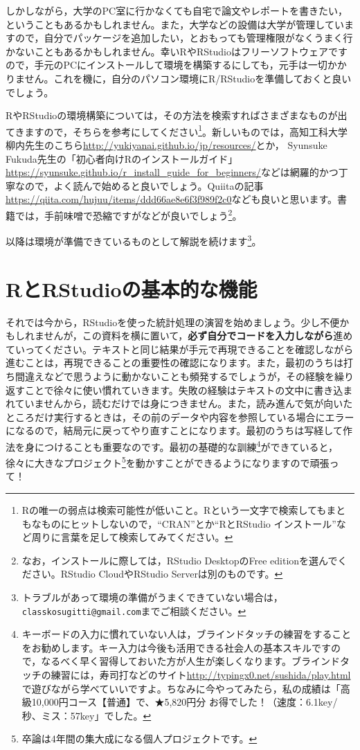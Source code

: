 \documentclass{ltjbook}
\begin{document}
しかしながら，大学のPC室に行かなくても自宅で論文やレポートを書きたい，ということもあるかもしれません。また，大学などの設備は大学が管理していますので，自分でパッケージを追加したい，とおもっても管理権限がなくうまく行かないこともあるかもしれません。幸いRやRStudioはフリーソフトウェアですので，手元のPCにインストールして環境を構築するにしても，元手は一切かかりません。これを機に，自分のパソコン環境にR/RStudioを準備しておくと良いでしょう。

RやRStudioの環境構築については，その方法を検索すればさまざまなものが出てきますので，そちらを参考にしてください\footnote{Rの唯一の弱点は検索可能性が低いこと。Rという一文字で検索してもまともなものにヒットしないので，``CRAN''とか``RとRStudio インストール''など周りに言葉を足して検索してみてください。}。新しいものでは，高知工科大学柳内先生のこちら\url{http://yukiyanai.github.io/jp/resources/}とか，
Syunsuke Fukuda先生の「初心者向けRのインストールガイド」\url{https://syunsuke.github.io/r_install_guide_for_beginners/}などは網羅的かつ丁寧なので，よく読んで始めると良いでしょう。Quiitaの記事\url{https://qiita.com/hujuu/items/ddd66ae8e6f3f989f2c0}なども良いと思います。書籍では，手前味噌で恐縮ですが\citet{kosugi2019}などが良いでしょう\footnote{なお，インストールに際しては，RStudio DesktopのFree editionを選んでください。RStudio CloudやRStudio Serverは別のものです。}。

以降は環境が準備できているものとして解説を続けます\footnote{トラブルがあって環境の準備がうまくできていない場合は，\texttt{classkosugitti@gmail.com}までご相談ください。}。

\section{RとRStudioの基本的な機能}
それでは今から，RStudioを使った統計処理の演習を始めましょう。少し不便かもしれませんが，この資料を横に置いて，\textbf{必ず自分でコードを入力しながら}進めていってください。テキストと同じ結果が手元で再現できることを確認しながら進むことは，再現できることの重要性の確認になります。また，最初のうちは打ち間違えなどで思うように動かないことも頻発するでしょうが，その経験を繰り返すことで徐々に使い慣れていきます。失敗の経験はテキストの文中に書き込まれていませんから，読むだけでは身につきません。また，読み進んで気が向いたところだけ実行するときは，その前のデータや内容を参照している場合にエラーになるので，結局元に戻ってやり直すことになります。最初のうちは写経して作法を身につけることも重要なのです。最初の基礎的な訓練\footnote{キーボードの入力に慣れていない人は，ブラインドタッチの練習をすることをお勧めします。キー入力は今後も活用できる社会人の基本スキルですので，なるべく早く習得しておいた方が人生が楽しくなります。ブラインドタッチの練習には，寿司打などのサイト\url{http://typingx0.net/sushida/play.html}で遊びながら学べていいですよ。ちなみに今やってみたら，私の成績は「高級10,000円コース【普通】で、★5,820円分 お得でした！（速度：6.1key/秒、ミス：57key」でした。}ができていると，徐々に大きなプロジェクト\footnote{卒論は4年間の集大成になる個人プロジェクトです。}を動かすことができるようになりますので頑張って！
\end{document}
